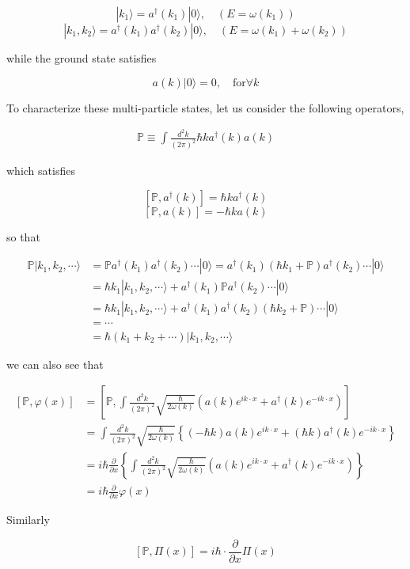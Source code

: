 \[|k_1\rangle = a^\dagger(k_1)|0\rangle,\quad (E=\omega(k_1)) \]
\[|k_1,k_2\rangle = a^\dagger(k_1)a^\dagger(k_2)|0\rangle,\quad (E=\omega(k_1)+\omega(k_2)) \]

while the ground state satisfies

\[a(k)|0\rangle = 0,\quad\text{for}\forall k \]

To characterize these multi-particle states, let us consider the following operators, 

\begin{align}
\mathbb{P} \equiv\int\frac{d^2 k}{(2\pi)^2}\hbar{k}a^\dagger({k})a({k})
\end{align}

which satisfies

\[[\mathbb{P},a^\dagger({k})] = \hbar {k}a^\dagger(k) \]
\[[\mathbb{P},a(k)] = -\hbar ka(k) \]

so that

\[\begin{split}
\mathbb{P}|k_1,k_2,\cdots\rangle &= \mathbb{P}a^\dagger(k_1)a^\dagger(k_2)\cdots|0\rangle  = a^\dagger(k_1)(\hbar k_1+\mathbb{P})a^\dagger(k_2)\cdots|0\rangle\\
&= \hbar k_1 |k_1,k_2,\cdots\rangle + a^\dagger(k_1)\mathbb{P}a^\dagger(k_2)\cdots|0\rangle\\
&= \hbar k_1|k_1,k_2,\cdots\rangle + a^\dagger(k_1)a^\dagger(k_2)(\hbar k_2+\mathbb{P})\cdots|0\rangle\\
&=\cdots\\
&=\hbar(k_1+k_2+\cdots)|k_1,k_2,\cdots\rangle
\end{split}\]

we can also see that

\[\begin{split}
[\mathbb{P},\varphi(x)] &= \left[\mathbb{P},\int\frac{d^2k}{(2\pi)^2}\sqrt{\frac{\hbar}{2\omega(k)}}\left(a(k)e^{ik\cdot x}+a^\dagger(k)e^{-ik\cdot x}\right)\right]\\
&= \int\frac{d^2 k}{(2\pi)^2}\sqrt{\frac{\hbar}{2\omega(k)}}\left\{(-\hbar k)a(k)e^{ik\cdot x}+(\hbar k)a^\dagger(k)e^{-ik\cdot x}\right\}\\
&= i\hbar\frac{\partial}{\partial x}\left\{\int\frac{d^2 k}{(2\pi)^2}\sqrt{\frac{\hbar}{2\omega(k)}}\left(a(k)e^{ik\cdot x}+a^\dagger(k)e^{-ik\cdot x}\right)\right\}\\
&=i\hbar\frac{\partial}{\partial x}\varphi(x)
\end{split}\]

Similarly

\[[\mathbb{P},\Pi(x)] = i\hbar\cdot\frac{\partial}{\partial x}\Pi(x) \]

